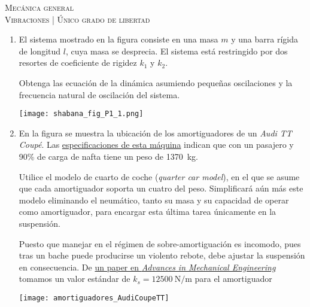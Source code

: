 \documentclass[11pt,spanish,a4paper]{article}
\begin{document}
\begin{center}
	\textsc{\large Mecánica general}\\
	\textsc{\large Vibraciones | Único grado de libertad}
\end{center}


\begin{enumerate}

				
\item 
\begin{minipage}[t][4cm]{0.65\textwidth}
El sistema mostrado en la figura consiste en una masa $m$ y una barra rígida de longitud $l$, cuya masa se desprecia.
El sistema está restringido por dos resortes de coeficiente de rigidez $k_1$ y $k_2$.

Obtenga las ecuación de la dinámica asumiendo pequeñas oscilaciones y la frecuencia natural de oscilación del sistema.
\end{minipage}
\begin{minipage}[c][3cm][t]{0.3\textwidth}
	\texttt{[image: shabana\_fig\_P1\_1.png]}
\end{minipage}



\item 
\begin{minipage}[t][6cm]{0.65\textwidth}
En la figura se muestra la ubicación de los amortiguadores de un \emph{Audi TT Coupé}.
Las \href{https://www.audi.de/de/brand/de/neuwagen/tt/tt-coupe.html#layer=/de/brand/de/neuwagen/tt/tt-coupe.engine_compare.fvp09g_0.techdata.html}{especificaciones de esta máquina} indican que con un pasajero y 90\% de carga de nafta tiene un peso de \SI{1370}{\kilo\gram}.

Utilice el modelo de cuarto de coche (\emph{quarter car model}), en el que se asume que cada amortiguador soporta un cuatro del peso.
Simplificará aún más este modelo eliminando el neumático, tanto su masa y su capacidad de operar como amortiguador, para encargar esta última tarea únicamente en la suspensión.

Puesto que manejar en el régimen de sobre-amortiguación es incomodo, pues tras un bache puede producirse un violento rebote, debe ajustar la suspensión en consecuencia.
De \href{https://journals.sagepub.com/doi/pdf/10.1177/1687814016648638}{un paper en \emph{Advances in Mechanical Engineering}} tomamos un valor estándar de $k_s = \SI{12500}{\newton\per\metre}$ para el amortiguador
\end{minipage}
\begin{minipage}[c][0cm][t]{0.3\textwidth}
	\texttt{[image: amortiguadores\_AudiCoupeTT]}
\end{minipage}




\end{enumerate}
\end{document}
